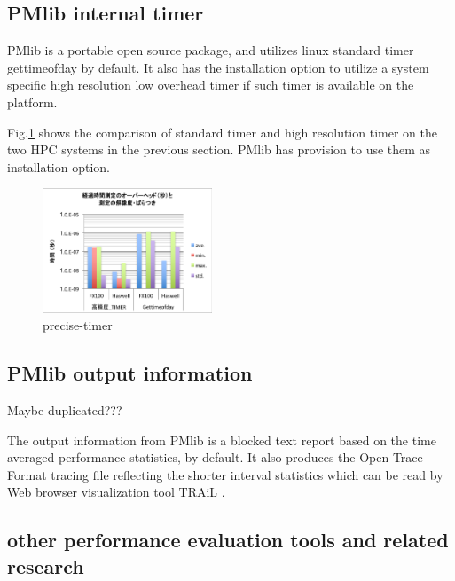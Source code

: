 \documentclass[conference]{IEEEtran}
\begin{document}







\subsection{PMlib internal timer}
PMlib is a portable open source package, and utilizes linux standard timer
gettimeofday by default. It also has the installation option to utilize
a system specific high resolution low overhead timer if such timer is
available on the platform.

Fig.\ref{fig:precise-timer} shows the comparison of standard timer and
high resolution timer on the two HPC systems in the previous section.
PMlib has provision to use them as installation option.
\begin{figure}[bt]
\centering
\includegraphics[width=0.45\textwidth]{figs/precise-timer.pdf}
\caption{precise-timer}
\label{fig:precise-timer}
\end{figure}



\subsection{PMlib output information}

{\color{blue} Maybe duplicated???}

The output information from PMlib is a blocked text report based on
the time averaged performance statistics, by default.
It also produces the Open Trace Format \cite{} tracing file reflecting
the shorter interval statistics which can be read by Web browser
visualization tool TRAiL \cite{}.


\subsection{other performance evaluation tools and related research}
\end{document}
